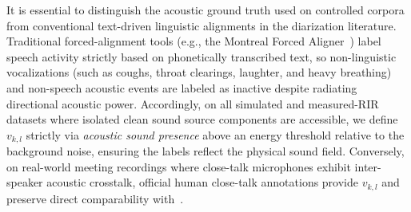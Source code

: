 \documentclass[lettersize,journal]{IEEEtran}
\begin{document}
It is essential to distinguish the acoustic ground truth used on controlled corpora from conventional text-driven linguistic alignments in the diarization literature. Traditional forced-alignment tools (e.g., the Montreal Forced Aligner~\cite{mcauliffe2017montreal}) label speech activity strictly based on phonetically transcribed text, so non-linguistic vocalizations (such as coughs, throat clearings, laughter, and heavy breathing) and non-speech acoustic events are labeled as inactive despite radiating directional acoustic power. Accordingly, on all simulated and measured-\gls{RIR} datasets where isolated clean sound source components are accessible, we define $v_{k,l}$ strictly via \emph{acoustic sound presence} above an energy threshold relative to the background noise, ensuring the labels reflect the physical sound field. Conversely, on real-world meeting recordings where close-talk microphones exhibit inter-speaker acoustic crosstalk, official human close-talk annotations provide $v_{k,l}$ and preserve direct comparability with~\cite{cornell2022overlapped}.
\end{document}

